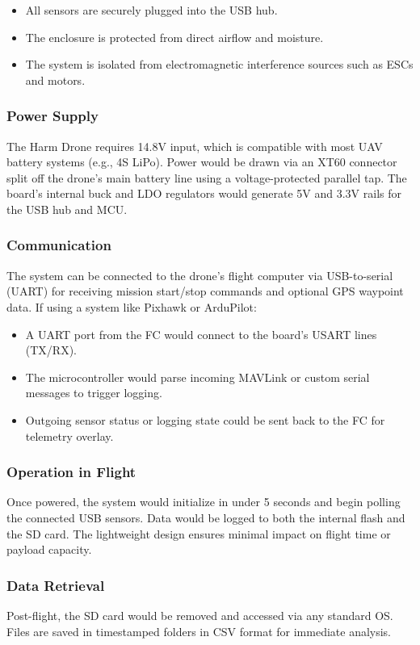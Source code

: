 \documentclass[../main.tex]{subfiles}
\begin{document}
\begin{itemize}
    \item All sensors are securely plugged into the USB hub.
    \item The enclosure is protected from direct airflow and moisture.
    \item The system is isolated from electromagnetic interference sources such as ESCs and motors.
\end{itemize}

\subsubsection*{Power Supply}
The Harm Drone requires 14.8V input, which is compatible with most UAV battery systems (e.g., 4S LiPo). Power would be drawn via an XT60 connector split off the drone’s main battery line using a voltage-protected parallel tap. The board's internal buck and LDO regulators would generate 5V and 3.3V rails for the USB hub and MCU.

\subsubsection{Communication}
The system can be connected to the drone’s flight computer via USB-to-serial (UART) for receiving mission start/stop commands and optional GPS waypoint data. If using a system like Pixhawk or ArduPilot:

\begin{itemize}
    \item A UART port from the FC would connect to the board’s USART lines (TX/RX).
    \item The microcontroller would parse incoming MAVLink or custom serial messages to trigger logging.
    \item Outgoing sensor status or logging state could be sent back to the FC for telemetry overlay.
\end{itemize}

\subsubsection{Operation in Flight}
Once powered, the system would initialize in under 5 seconds and begin polling the connected USB sensors. Data would be logged to both the internal flash and the SD card. The lightweight design ensures minimal impact on flight time or payload capacity.

\subsubsection{Data Retrieval}
Post-flight, the SD card would be removed and accessed via any standard OS. Files are saved in timestamped folders in CSV format for immediate analysis.
\end{document}
